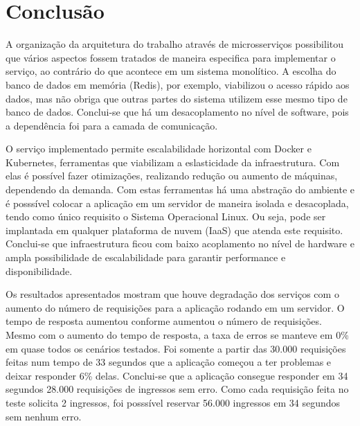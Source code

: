 \chapter*[Conclusão]{Conclusão}

A organização da arquitetura do trabalho através de microsserviços possibilitou
que vários aspectos fossem tratados de maneira especifica para implementar o serviço,
ao contrário do que acontece em um sistema monolítico.
A escolha do banco de dados em memória (Redis), por exemplo,
viabilizou o acesso rápido aos dados, mas não obriga que outras partes do sistema
utilizem esse mesmo tipo de banco de dados.
Conclui-se que há um desacoplamento no nível de software, pois a dependência foi
para a camada de comunicação.

O serviço implementado permite escalabilidade horizontal com
Docker e Kubernetes, ferramentas que viabilizam a eslasticidade da infraestrutura.
Com elas é possível fazer otimizações, realizando
redução ou aumento de máquinas, dependendo da demanda.
Com estas ferramentas há uma abstração do ambiente e é posssível colocar a aplicação
em um servidor de maneira isolada e desacoplada, tendo como único requisito
o Sistema Operacional Linux.
Ou seja, pode ser implantada em qualquer plataforma de nuvem (IaaS) que atenda
este requisito.
Conclui-se que infraestrutura ficou com baixo acoplamento no nível de hardware
e ampla possibilidade de escalabilidade para garantir performance e disponibilidade.

Os resultados apresentados mostram que houve degradação dos serviços com o aumento do
número de requisições para a aplicação rodando em um servidor.
O tempo de resposta aumentou conforme aumentou o número de requisições.
Mesmo com o aumento do tempo de resposta, a taxa de erros se manteve em 0\% em
quase todos os cenários testados.
Foi somente a partir das 30.000 requisições feitas num tempo de 33 segundos que
a aplicação começou a ter problemas e deixar responder 6\% delas.
Conclui-se que a aplicação consegue responder em 34 segundos
28.000 requisições de ingressos sem erro.
Como cada requisição feita no teste solicita 2 ingressos, foi posssível
reservar 56.000 ingressos em 34 segundos sem nenhum erro.




